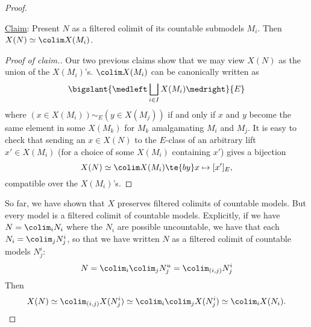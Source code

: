 \begin{proof}
    \begin{description}
    \item \ul{Claim}: Present $N$ as a filtered colimit of its countable submodels $M_i$. Then $X(N) \simeq \colim X(M_i)$.
      \begin{proof}[Proof of claim.]
        Our two previous claims show that we may view $X(N)$ as the union of the $X(M_i)$'s. $\colim X(M_i)$ can be canonically written as
        $$
\bigslant{\medleft\bigsqcup_{i \in I} X(M_i)\medright}{E}
$$
where $(x \in X(M_i)) \sim_E (y \in X(M_j))$ if and only if $x$ and $y$ become the same element in some $X(M_k)$ for $M_k$ amalgamating $M_i$ and $M_j$. It is easy to check that sending an $x \in X(N)$ to the $E$-class of an arbitrary lift $x' \in X(M_i)$ (for a choice of some $X(M_i)$ containing $x'$) gives a bijection
$$
X(N) \simeq \colim X(M_i) \te{ by } x \mapsto [x']_E,
$$
compatible over the $X(M_i)$'s.
      \end{proof}
    \end{description}
        So far, we have shown that $X$ preserves filtered colimits of countable models. But every model is a filtered colimit of countable models. Explicitly, if we have $N = \colim_i N_i$ where the $N_i$ are possible uncountable, we have that each $N_i = \colim_j N^i_j$, so that we have written $N$ as a filtered colimit of countable models $N^i_j$:
$$
N = \colim_i \colim_j N^u_j = \colim_{(i,j)} N^i_j
$$
Then
$$
X(N) \simeq \colim_{(i,j)} X(N^i_j) \simeq \colim_i \colim_j X(N^i_j) \simeq \colim_i X(N_i).
$$
\end{proof}


